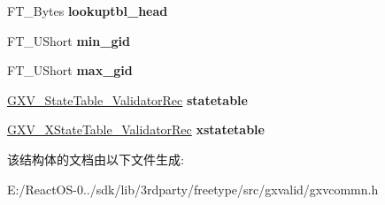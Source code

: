 \begin{DoxyCompactItemize}
\mbox{\label{struct_g_x_v___validator_rec___a6c6e818fa3ad9f2e4bad5c5f7ebfc156}} 
F\+T\+\_\+\+Bytes {\bfseries lookuptbl\+\_\+head}
\item 
\mbox{\label{struct_g_x_v___validator_rec___a9ceebe8532a8e4fc16194a38cb6a0fc1}} 
F\+T\+\_\+\+U\+Short {\bfseries min\+\_\+gid}
\item 
\mbox{\label{struct_g_x_v___validator_rec___a4b20f88d0ab67f441fc44a5472d73d05}} 
F\+T\+\_\+\+U\+Short {\bfseries max\+\_\+gid}
\item 
\mbox{\label{struct_g_x_v___validator_rec___a10719f46b658d00f0adfd77aa70b1d37}} 
\hyperlink{struct_g_x_v___state_table___validator_rec__}{G\+X\+V\+\_\+\+State\+Table\+\_\+\+Validator\+Rec} {\bfseries statetable}
\item 
\mbox{\label{struct_g_x_v___validator_rec___a175caf5071de1e4ec0b3da1f9ad909e9}} 
\hyperlink{struct_g_x_v___x_state_table___validator_rec__}{G\+X\+V\+\_\+\+X\+State\+Table\+\_\+\+Validator\+Rec} {\bfseries xstatetable}
\end{DoxyCompactItemize}


该结构体的文档由以下文件生成\+:\begin{DoxyCompactItemize}
\item 
E\+:/\+React\+O\+S-\/0../sdk/lib/3rdparty/freetype/src/gxvalid/gxvcommn.\+h\end{DoxyCompactItemize}
